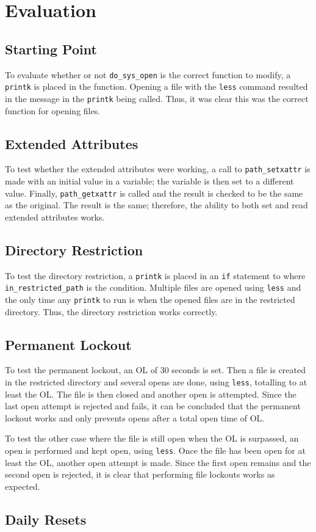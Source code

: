 \section{Evaluation}

\subsection{Starting Point}

To evaluate whether or not \texttt{do\_sys\_open} is the correct function to modify, a \texttt{printk} is placed in the function. Opening a file with the \texttt{less} command resulted in the message in the \texttt{printk} being called. Thus, it was clear this was the correct function for opening files.

\subsection{Extended Attributes}

To test whether the extended attributes were working, a call to \texttt{path\_setxattr} is made with an initial value in a variable; the variable is then set to a different value. Finally, \texttt{path\_getxattr} is called and the result is checked to be the same as the original. The result is the same; therefore, the ability to both set and read extended attributes works.

\subsection{Directory Restriction}

To test the directory restriction, a \texttt{printk} is placed in an \texttt{if} statement to where \texttt{in\_restricted\_path} is the condition. Multiple files are opened using \texttt{less} and the only time any \texttt{printk} to run is when the opened files are in the restricted directory. Thus, the directory restriction works correctly.

\subsection{Permanent Lockout}

To test the permanent lockout, an OL of 30 seconds is set. Then a file is created in the restricted directory and several opens are done, using \texttt{less}, totalling to at least the OL. The file is then closed and another open is attempted. Since the last open attempt is rejected and fails, it can be concluded that the permanent lockout works and only prevents opens after a total open time of OL.

To test the other case where the file is still open when the OL is surpassed, an open is performed and kept open, using \texttt{less}. Once the file has been open for at least the OL, another open attempt is made. Since the first open remains and the second open is rejected, it is clear that performing file lockouts works as expected.

\subsection{Daily Resets}

